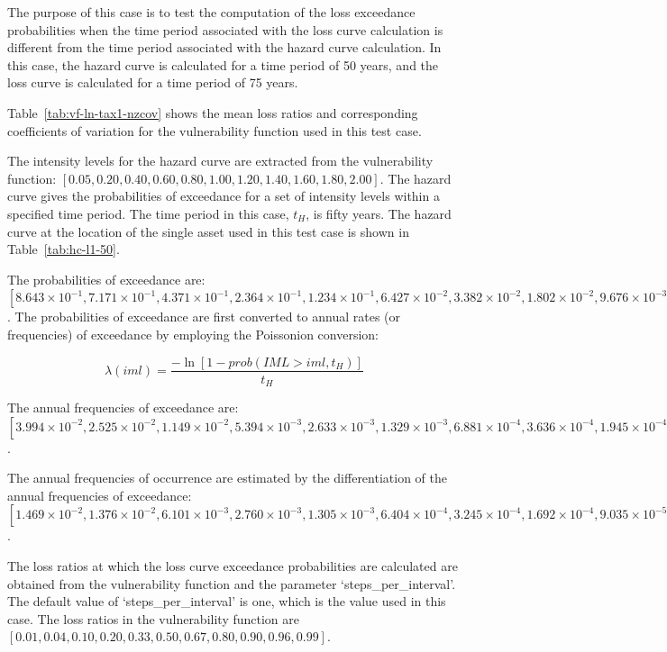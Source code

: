 The purpose of this case is to test the computation of the loss exceedance probabilities when the time period associated with the loss curve calculation is different from the time period associated with the hazard curve calculation. In this case, the hazard curve is calculated for a time period of 50 years, and the loss curve is calculated for a time period of 75 years.

Table~\ref{tab:vf-ln-tax1-nzcov} shows the mean loss ratios and corresponding coefficients of variation for the vulnerability function used in this test case.



The intensity levels for the hazard curve are extracted from the vulnerability function: $[0.05, 0.20, 0.40, 0.60, 0.80, 1.00, 1.20, 1.40, 1.60, 1.80, 2.00]$. The hazard curve gives the probabilities of exceedance for a set of intensity levels within a specified time period. The time period in this case, $t_H$, is fifty years. The hazard curve at the location of the single asset used in this test case is shown in Table~\ref{tab:hc-l1-50}.

The probabilities of exceedance are: $[8.643\times10^{-1}, 7.171\times10^{-1}, 4.371\times10^{-1}, 2.364\times10^{-1}, 1.234\times10^{-1}, 6.427\times10^{-2}, 3.382\times10^{-2}, 1.802\times10^{-2}, 9.676\times10^{-3}, 5.192\times10^{-3}, 2.748\times10^{-3}]$. The probabilities of exceedance are first converted to annual rates (or frequencies) of exceedance by employing the Poissonion conversion:

\begin{equation}
	\lambda(iml) = \frac{-\ln [1 - prob(IML > iml, t_H)]}{t_H}
\end{equation}

The annual frequencies of exceedance are: $[3.994\times10^{-2}, 2.525\times10^{-2}, 1.149\times10^{-2}, 5.394\times10^{-3}, 2.633\times10^{-3}, 1.329\times10^{-3}, 6.881\times10^{-4}, 3.636\times10^{-4}, 1.945\times10^{-4}, 1.041\times10^{-4}, 5.504\times10^{-5}]$.

The annual frequencies of occurrence are estimated by the differentiation of the annual frequencies of exceedance: $[1.469\times10^{-2}, 1.376\times10^{-2}, 6.101\times10^{-3}, 2.760\times10^{-3}, 1.305\times10^{-3}, 6.404\times10^{-4}, 3.245\times10^{-4}, 1.692\times10^{-4}, 9.035\times10^{-5}, 4.907\times10^{-5}]$.

The loss ratios at which the loss curve exceedance probabilities are calculated are obtained from the vulnerability function and the parameter `steps\_per\_interval'. The default value of `steps\_per\_interval' is one, which is the value used in this case. The loss ratios in the vulnerability function are $[0.01, 0.04, 0.10, 0.20, 0.33, 0.50, 0.67, 0.80, 0.90, 0.96, 0.99]$.

